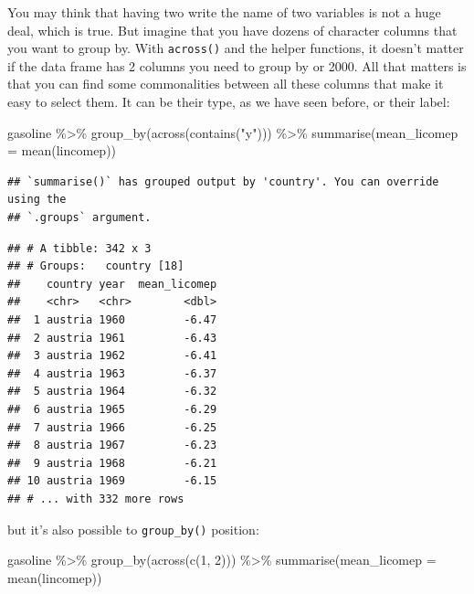 \documentclass[
]{article}
\newenvironment{Shaded}{\begin{snugshade}}{\end{snugshade}}
\newcommand{\AttributeTok}[1]{\textcolor[rgb]{0.77,0.63,0.00}{#1}}
\newcommand{\DecValTok}[1]{\textcolor[rgb]{0.00,0.00,0.81}{#1}}
\newcommand{\FunctionTok}[1]{\textcolor[rgb]{0.00,0.00,0.00}{#1}}
\newcommand{\NormalTok}[1]{#1}
\newcommand{\SpecialCharTok}[1]{\textcolor[rgb]{0.00,0.00,0.00}{#1}}
\newcommand{\StringTok}[1]{\textcolor[rgb]{0.31,0.60,0.02}{#1}}
\begin{document}
You may think that having two write the name of two variables is not a huge deal, which is true.
But imagine that you have dozens of character columns that you want to group by.
With \texttt{across()} and the helper functions, it doesn't matter if the data frame has 2 columns
you need to group by or 2000. All that matters is that you can find some commonalities between
all these columns that make it easy to select them. It can be their type, as we have seen
before, or their label:

\begin{Shaded}
\begin{Highlighting}[]
\NormalTok{gasoline }\SpecialCharTok{\%\textgreater{}\%}
  \FunctionTok{group\_by}\NormalTok{(}\FunctionTok{across}\NormalTok{(}\FunctionTok{contains}\NormalTok{(}\StringTok{"y"}\NormalTok{))) }\SpecialCharTok{\%\textgreater{}\%}
  \FunctionTok{summarise}\NormalTok{(}\AttributeTok{mean\_licomep =} \FunctionTok{mean}\NormalTok{(lincomep))}
\end{Highlighting}
\end{Shaded}

\begin{verbatim}
## `summarise()` has grouped output by 'country'. You can override using the
## `.groups` argument.
\end{verbatim}

\begin{verbatim}
## # A tibble: 342 x 3
## # Groups:   country [18]
##    country year  mean_licomep
##    <chr>   <chr>        <dbl>
##  1 austria 1960         -6.47
##  2 austria 1961         -6.43
##  3 austria 1962         -6.41
##  4 austria 1963         -6.37
##  5 austria 1964         -6.32
##  6 austria 1965         -6.29
##  7 austria 1966         -6.25
##  8 austria 1967         -6.23
##  9 austria 1968         -6.21
## 10 austria 1969         -6.15
## # ... with 332 more rows
\end{verbatim}

but it's also possible to \texttt{group\_by()} position:

\begin{Shaded}
\begin{Highlighting}[]
\NormalTok{gasoline }\SpecialCharTok{\%\textgreater{}\%}
    \FunctionTok{group\_by}\NormalTok{(}\FunctionTok{across}\NormalTok{(}\FunctionTok{c}\NormalTok{(}\DecValTok{1}\NormalTok{, }\DecValTok{2}\NormalTok{))) }\SpecialCharTok{\%\textgreater{}\%}
    \FunctionTok{summarise}\NormalTok{(}\AttributeTok{mean\_licomep =} \FunctionTok{mean}\NormalTok{(lincomep))}
\end{Highlighting}
\end{Shaded}
\end{document}
